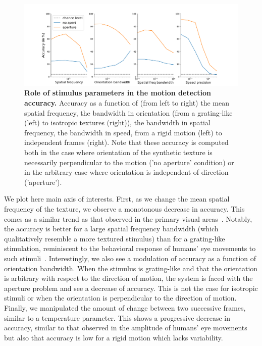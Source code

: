 \documentclass[default]{sn-jnl}%
\theoremstyle{thmstyleone}%
\theoremstyle{thmstyletwo}%
\theoremstyle{thmstylethree}%
\newcommand{\note}[1]{{\sethlcolor{yellow}\hl{#1}}}
\begin{document}
\begin{figure}%
    \centering
    \includegraphics[width=0.99\linewidth]{figures/motion_clouds.pdf} %
    \caption{{\bf Role of stimulus parameters in the motion detection accuracy.} Accuracy as a function of (from left to right) the mean spatial frequency, the bandwidth in orientation (from a grating-like (left) to isotropic textures (right)), the bandwidth in spatial frequency, the bandwidth in speed, from a rigid motion (left) to independent frames (right). Note that these accuracy is computed both in the case where orientation of the synthetic texture is necessarily perpendicular to the motion ('no aperture' condition) or in the arbitrary case where orientation is independent of direction ('aperture').}
    \label{fig:motion_clouds}
\end{figure}

We plot here main axis of interests. First, as we change the mean spatial frequency of the texture, we observe a monotonous decrease in accuracy. This comes as a similar trend as that observed in the primary visual areas~\citep{priebe_tuning_2006}. %
Notably, the accuracy is better for a large spatial frequency bandwidth (which qualitatively resemble a more textured stimulus) than for a grating-like stimulation, reminiscent to the behavioral response of humans' eye movements to such stimuli~\citep{simoncini_more_2012}. Interestingly, we also see a modulation of accuracy as a function of orientation bandwidth. When the stimulus is grating-like and that the orientation is arbitrary with respect to the direction of motion, the system is faced with the aperture problem and see a decrease of accuracy. This is not the case for isotropic stimuli or when the orientation is perpendicular to the direction of motion. Finally, we manipulated the amount of change between two successive frames, similar to a temperature parameter. This shows a progressive decrease in accuracy, similar to that observed in the amplitude of humans' eye movements~\citep{mansour_pour_speed_2018} but also that accuracy is low for a rigid motion which lacks variability.
%
\end{document}
